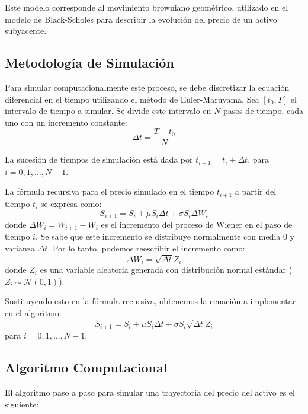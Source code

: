 \documentclass[12pt]{article}
\begin{document}
Este modelo corresponde al movimiento browniano geométrico, utilizado en el modelo de Black-Scholes para describir la evolución del precio de un activo subyacente.

\subsection{Metodología de Simulación}

Para simular computacionalmente este proceso, se debe discretizar la ecuación diferencial en el tiempo utilizando el método de Euler-Maruyama. Sea $[t_0, T]$ el intervalo de tiempo a simular. Se divide este intervalo en $N$ pasos de tiempo, cada uno con un incremento constante:
\begin{equation}
\Delta t = \frac{T - t_0}{N}
\end{equation}

La sucesión de tiempos de simulación está dada por $t_{i+1} = t_i + \Delta t$, para $i = 0, 1, \dots, N-1$.

La fórmula recursiva para el precio simulado en el tiempo $t_{i+1}$ a partir del tiempo $t_i$ se expresa como:
\begin{equation}
S_{i+1} = S_i + \mu S_i \Delta t + \sigma S_i \Delta W_i
\end{equation}
donde $\Delta W_i = W_{i+1} - W_i$ es el incremento del proceso de Wiener en el paso de tiempo $i$. Se sabe que este incremento se distribuye normalmente con media 0 y varianza $\Delta t$. Por lo tanto, podemos reescribir el incremento como:
\begin{equation}
\Delta W_i = \sqrt{\Delta t} Z_i
\end{equation}
donde $Z_i$ es una variable aleatoria generada con distribución normal estándar ($Z_i \sim \mathcal{N}(0,1)$).

Sustituyendo esto en la fórmula recursiva, obtenemos la ecuación a implementar en el algoritmo:
\begin{equation}
S_{i+1} = S_i + \mu S_i \Delta t + \sigma S_i \sqrt{\Delta t} Z_i
\end{equation}
para $i = 0, 1, \dots, N-1$.

\subsection{Algoritmo Computacional}

El algoritmo paso a paso para simular una trayectoria del precio del activo es el siguiente:
\end{document}
